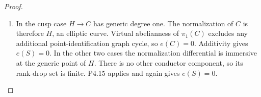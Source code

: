 \begin{proof}
\begin{enumerate}[label={$\langle1\rangle$\arabic*.},leftmargin=*]
\item In the cusp case $H\to C$ has generic degree one.
The normalization of $C$ is therefore $H$, an elliptic
curve. Virtual abelianness of $\pi_1(C)$ excludes any
additional point-identification graph cycle, so
$e(C)=0$. Additivity gives $e(S)=0$. In the other two
cases the normalization differential is immersive at
the generic point of $H$. There is no other conductor
component, so its rank-drop set is finite. P4.15
applies and again gives $e(S)=0$.

\end{enumerate}
\end{proof}
